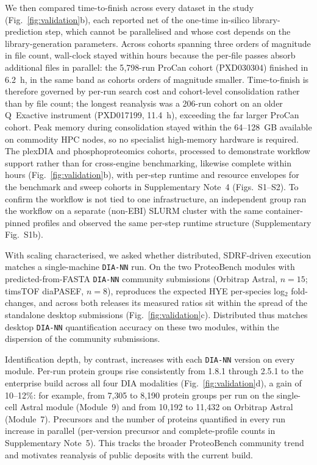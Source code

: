 \documentclass[preprint,12pt]{elsarticle}
\begin{document}
We then compared time-to-finish across every dataset in the study (Fig.~\ref{fig:validation}b), each reported net of the one-time in-silico library-prediction step, which cannot be parallelised and whose cost depends on the library-generation parameters. Across cohorts spanning three orders of magnitude in file count, wall-clock stayed within hours because the per-file passes absorb additional files in parallel: the 5{,}798-run ProCan cohort (PXD030304) finished in 6.2~h, in the same band as cohorts orders of magnitude smaller. Time-to-finish is therefore governed by per-run search cost and cohort-level consolidation rather than by file count; the longest reanalysis was a 206-run cohort on an older Q~Exactive instrument (PXD017199, 11.4~h), exceeding the far larger ProCan cohort. Peak memory during consolidation stayed within the 64--128~GB available on commodity HPC nodes, so no specialist high-memory hardware is required. The plexDIA and phosphoproteomics cohorts, processed to demonstrate workflow support rather than for cross-engine benchmarking, likewise complete within hours (Fig.~\ref{fig:validation}b), with per-step runtime and resource envelopes for the benchmark and sweep cohorts in Supplementary Note~4 (Figs.~S1--S2). To confirm the workflow is not tied to one infrastructure, an independent group ran the workflow on a separate (non-EBI) SLURM cluster with the same container-pinned profiles and observed the same per-step runtime structure (Supplementary Fig.~S1b).

With scaling characterised, we asked whether distributed, SDRF-driven execution matches a single-machine \texttt{DIA-NN} run. On the two ProteoBench modules with predicted-from-FASTA \texttt{DIA-NN} community submissions (Orbitrap Astral, $n=15$; timsTOF diaPASEF, $n=8$), \quantmsdiann{} reproduces the expected HYE per-species log$_2$ fold-changes, and across both releases its measured ratios sit within the spread of the standalone desktop submissions (Fig.~\ref{fig:validation}c). Distributed \quantmsdiann{} thus matches desktop \texttt{DIA-NN} quantification accuracy on these two modules, within the dispersion of the community submissions.

Identification depth, by contrast, increases with each \texttt{DIA-NN} version on every module. Per-run protein groups rise consistently from 1.8.1 through 2.5.1 to the enterprise build across all four DIA modalities (Fig.~\ref{fig:validation}d), a gain of 10--12\%: for example, from 7{,}305 to 8{,}190 protein groups per run on the single-cell Astral module (Module~9) and from 10{,}192 to 11{,}432 on Orbitrap Astral (Module~7). Precursors and the number of proteins quantified in every run increase in parallel (per-version precursor and complete-profile counts in Supplementary Note~5). This tracks the broader ProteoBench community trend~\cite{devreese2025proteobench} and motivates reanalysis of public deposits with the current build.
\end{document}
